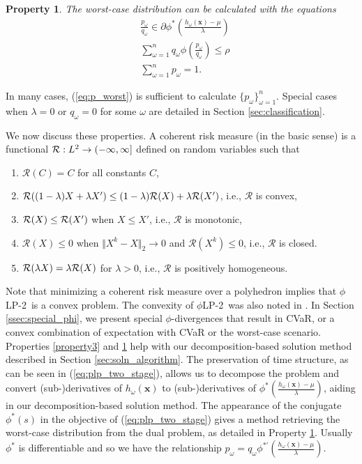 \documentclass[ijoc,letterpaper]{informs3} %
\newcommand{\x}{\mathbf{x}}
\newtheorem{property}[theorem]{Property}
\newcommand{\plp}{$\phi$LP-2}
\begin{document}
\begin{property}\label{property4}
	The worst-case distribution can be calculated with the equations
	\begin{align} 
		& \frac{p_\omega}{q_\omega} \in \partial \phi^*\left(\frac{h_\omega(\x)-\mu}{\lambda}\right) \label{eq:p_worst} \\
		& \sum_{\omega=1}^n q_\omega \phi\left(\frac{p_\omega}{q_\omega}\right) \leq \rho \nonumber \\
		& \sum_{\omega=1}^n p_\omega = 1. \nonumber
	\end{align}
\end{property}
In many cases, (\ref{eq:p_worst}) is sufficient to calculate $\{p_\omega\}_{\omega=1}^n$.
Special cases when $\lambda = 0$ or $q_\omega = 0$ for some $\omega$ are detailed in Section \ref{sec:classification}.


We now discuss these properties. A coherent risk measure (in the basic sense) is a functional ${\cal R}: L^2 \rightarrow (-\infty,\infty]$ defined on random variables such that \citep{rockafellar2007coherent}
\begin{enumerate}
	\item $\mathcal{R}(C) = C$ for all constants $C$,
	\item $\mathcal{R}((1-\lambda)X + \lambda X') \leq (1-\lambda){\cal R}(X) + \lambda {\cal R}(X')$, i.e., $\mathcal{R}$ is convex,
	\item $\mathcal{R}(X) \leq {\cal R}(X')$ when $X \leq X'$, i.e., $\mathcal{R}$ is monotonic,
	\item $\mathcal{R}(X) \leq 0$ when $\Vert X^k - X \Vert_2 \rightarrow 0$ and $\mathcal{R}(X^k) \leq 0$, i.e., $\mathcal{R}$ is closed.
	\item $\mathcal{R}(\lambda X) = \lambda {\cal R}(X)$ for $\lambda > 0$, i.e., $\mathcal{R}$ is positively homogeneous.
\end{enumerate}

\noindent Note that minimizing a coherent risk measure over a polyhedron implies that \plp\ is a convex problem.
The convexity of \plp\ was also noted in \citep{bental2011robust}.
In Section \ref{ssec:special_phi}, we present special $\phi$-divergences that result in CVaR, or a convex combination of expectation with CVaR or the worst-case scenario. 
Properties \ref{property3} and \ref{property4} help with our decomposition-based solution method described in Section \ref{sec:soln_algorithm}. 
The preservation of time structure, as can be seen in (\ref{eq:plp_two_stage}), allows us to decompose the problem and convert (sub-)derivatives of $h_\omega(\x)$ to (sub-)derivatives of $\phi^*\left(\frac{h_\omega(\x) - \mu}{\lambda}\right)$, aiding in our decomposition-based solution method. 
The appearance of the conjugate $\phi^*(s)$ in the objective of (\ref{eq:plp_two_stage}) gives a method retrieving the worst-case distribution from the dual problem, as detailed in Property \ref{property4}.  
Usually $\phi^*$ is differentiable and so we have the relationship $p_\omega = q_\omega \phi^{* \prime}(\frac{h_\omega(\x)-\mu}{\lambda})$. 
\end{document}
